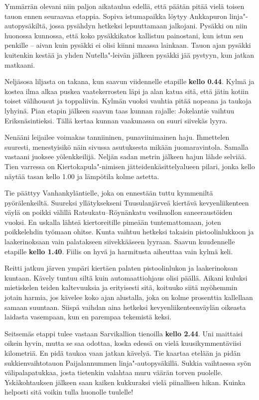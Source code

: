 \begin{multicols}{2}
Ymmärrän olevani niin paljon aikataulua edellä, että päätän pitää vielä toisen tauon ennen seuraavaa etappia. Sopiva istumapaikka löytyy Ankkapuron linja"-autopysäkiltä, jossa pysähdyn hetkeksi lepuuttamaan jalkojani. Pysäkki on niin huonossa kunnossa, että koko pysäkkikatos kallistuu painostani, kun istun sen penkille -- aivan kuin pysäkki ei olisi kiinni maassa lainkaan. Tauon ajan pysäkki kuitenkin kestää ja yhden Nutella"-leivän jälkeen pysäkki jää pystyyn, kun jatkan matkaani.

Neljäsosa liljasta on takana, kun saavun viidennelle etapille \textbf{kello 0.44}. Kylmä ja kostea ilma alkaa puskea vaatekerrosten läpi ja alan katua sitä, että jätin kotiin toiset välihousut ja toppaliivin. Kylmän vuoksi vauhtia pitää nopeana ja taukoja lyhyinä. Pian etapin jälkeen saavun taas kunnan rajalle: Jokelantie vaihtuu Eriksnäsintieksi. Tällä kertaa kunnan vaakunassa on suuri siivekäs lyyra. 

Nenääni leijailee voimakas tanniininen, punaviinimainen haju. Ihmettelen suuresti, menestyisikö näin sivussa asutuksesta mikään juomaravintola. Samalla vastaani juoksee yölenkkeilijä. Neljän sadan metrin jälkeen hajun lähde selviää. Tien varressa on Kiertokapula"-nimisen jätteidenkäsittelyalueen pilari, jonka kello näytää tasan kello 1.00 ja lämpötila kolme astetta. 

Tie päättyy Vanhankyläntielle, joka on ennestään tuttu kymmeniltä pyörälenkeiltä. Suureksi yllätyksekseni Tuusulanjärveä kiertävä kevyenliikenteen väylä on poikki välillä Ratsukatu--Röynänkatu vesihuollon saneeraustöiden vuoksi. En uskalla lähteä kiertoreitille pimeään tuntemattomaan, joten poikkelehdin työmaan ohitse. Kunta vaihtuu hetkeksi takaisin pistoolinlukkoon ja laakerinoksaan vain palatakseen siivekkääseen lyyraan. Saavun kuudennelle etapille \textbf{kello 1.40}. Fiilis on hyvä ja harmitusta aiheuttaa vain kylmä keli. 

Reitti jatkuu järven ympäri kiertäen palaten pistoolinlukon ja laakerinoksan kuntaan. Kävely tuntuu siltä kuin automaattiohjaus olisi päällä. Aikani kuluksi mietiskelen teiden kaltevuuksia ja erityisesti sitä, koituuko siitä myöhemmin jotain harmia, jos kävelee koko ajan alustalla, joka on kolme prosenttia kallellaan samaan suuntaan. Siispä vaihdan aina hetkeksi kevyenliikenteenväylän oikeasta laidasta vasempaan, kun en parempaa tekemistä keksi.

Seitsemäs etappi tulee vastaan Sarvikallion tienoilla \textbf{kello 2.44}. Uni maittaisi oikein hyvin, mutta se saa odottaa, koska edessä on vielä kuusikymmentäviisi kilometriä. En pidä taukoa vaan jatkan kävelyä. Tie kaartaa etelään ja pidän sukkienvaihtotauon Paijalannummen linja"-autopysäkillä. Sukkia vaihtaessa syön välipalapatukkaa, josta tietenkin valahtaa muru väärän torven puolelle. Yskäkohtauksen jälkeen saan kaiken kukkuraksi vielä piinallisen hikan. Kuinka helposti sitä voikin tulla huonolle tuulelle!


\end{multicols}
